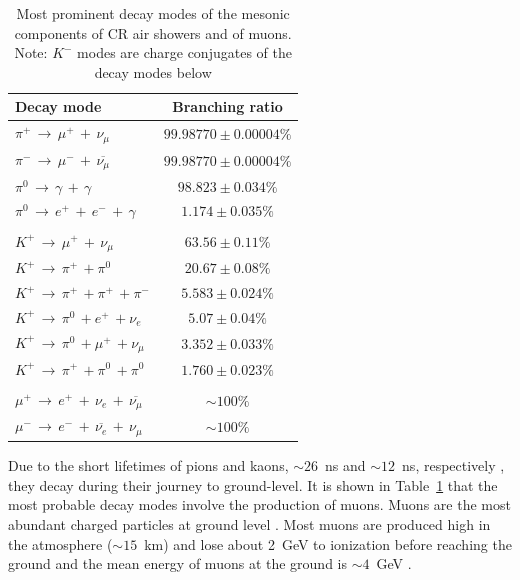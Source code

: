 \begin{table}[ht!]
	\begin{center}
		\caption{ Most prominent decay modes of the mesonic components of CR air showers and of muons. Note: $K^-$ modes are charge conjugates of the decay modes below \citep{particle_data_group_review_2020}}
		\label{tab:meson_decay}
		\begin{tabular}{lc}
			\hline
			Decay mode & Branching ratio  \\
			\hline
			{$ \pi^{+} \, \rightarrow \, \mu^{+} \, + \, \nu_{\mu} $}	 &  $99.98770 \pm 0.00004 \%$ \\
			{$ \pi^{-} \, \rightarrow \, \mu^{-} \, + \, \overline{\nu_{\mu}} $}  &  $99.98770 \pm 0.00004 \% $ \\
			{$ \pi^{0} \, \rightarrow \, \gamma \, + \, \gamma $} &  $98.823 \pm 0.034 \% $ \\
			{$ \pi^{0} \, \rightarrow \, e^+ \, + \, e^-  \, + \, \gamma $} &  $1.174 \pm 0.035 \% $ \\
			{}  & {} \\
			{$K^+ \, \rightarrow \, \mu^{+} \, + \, \nu_{\mu}$}  &  $63.56 \pm 0.11 \% $ \\
			{$K^+ \, \rightarrow \, \pi^{+} \, + \pi^{0} $}  &  $20.67 \pm 0.08 \% $ \\
			{$K^+ \, \rightarrow \, \pi^{+} \, + \pi^{+} \, + \pi^{-}$}  &  $5.583 \pm 0.024 \% $ \\
			{$K^+ \, \rightarrow \, \pi^{0} \, + e^{+} \, + \nu_{e}$}  & $5.07 \pm 0.04 \% $ \\ 		 		 		 		
			{$K^+ \, \rightarrow \, \pi^{0} \, + \mu^{+} \, + \nu_{\mu}$}  &  $3.352 \pm 0.033 \% $\\ 		 		 		 		
			{$K^+ \, \rightarrow \, \pi^{+} \, + \pi^{0} \, + \pi^{0}$}  &  $1.760 \pm 0.023 \% $\\
			{}  & {} \\
			{$ \mu^{+} \, \rightarrow \, e^{+} \, + \, \nu_e \, + \, \overline{\nu_{\mu}} $}  &  $\sim 100\%$\\	
			{$ \mu^{-} \, \rightarrow \, e^{-} \, + \, \overline{\nu_e} \, + \, \nu_{\mu} $}  &  $\sim 100\%$\\	
			\hline
		\end{tabular}
	\end{center}
\end{table}


Due to the short lifetimes of pions and kaons, $\sim26$~ns and $\sim12$~ns, respectively \citep{particle_data_group_review_2020}, they decay during their journey to ground-level. It is shown in Table~\ref{tab:meson_decay} that the most probable decay modes involve the production of muons. Muons are the most abundant charged particles at ground level \citep{particle_data_group_review_2020}. Most muons are produced high in the atmosphere ($\sim15$~km) and lose about 2~GeV to ionization before reaching the ground and the mean energy of muons at the ground is $\sim4$~GeV \citep{particle_data_group_review_2020}.

